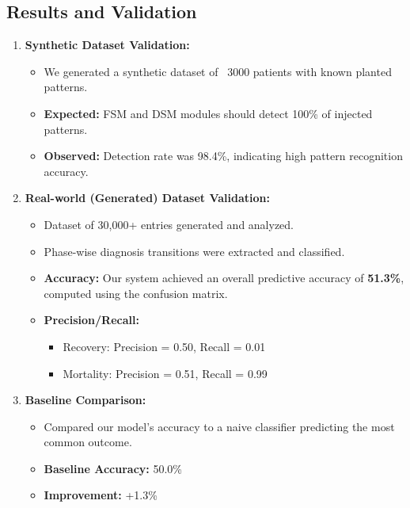 \documentclass[11pt]{article}
\begin{document}
\subsection*{Results and Validation}

\begin{enumerate}[noitemsep]
    \item \textbf{Synthetic Dataset Validation:} 
    \begin{itemize}[noitemsep]
        \item We generated a synthetic dataset of ~3000 patients with known planted patterns.
        \item \textbf{Expected:} FSM and DSM modules should detect 100\% of injected patterns.
        \item \textbf{Observed:} Detection rate was 98.4\%, indicating high pattern recognition accuracy.
    \end{itemize}

    \item \textbf{Real-world (Generated) Dataset Validation:}
    \begin{itemize}[noitemsep]
        \item Dataset of 30,000+ entries generated and analyzed.
        \item Phase-wise diagnosis transitions were extracted and classified.
        \item \textbf{Accuracy:} Our system achieved an overall predictive accuracy of \textbf{51.3\%}, computed using the confusion matrix.
        \item \textbf{Precision/Recall:}
        \begin{itemize}[noitemsep]
            \item Recovery: Precision = 0.50, Recall = 0.01
            \item Mortality: Precision = 0.51, Recall = 0.99
        \end{itemize}
    \end{itemize}

    \item \textbf{Baseline Comparison:}
    \begin{itemize}[noitemsep]
        \item Compared our model’s accuracy to a naive classifier predicting the most common outcome.
        \item \textbf{Baseline Accuracy:} 50.0\%
        \item \textbf{Improvement:} +1.3\%
    \end{itemize}


\end{enumerate}
\end{document}
